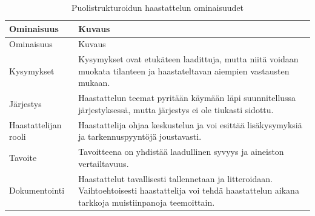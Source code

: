 \documentclass[
  finnish,
  letterpaper,
  DIV=11,
  numbers=noendperiod,
  oneside]{scrreprt}
\begin{document}
\begin{longtable}[]{@{}
  >{\raggedright\arraybackslash}p{}
  >{\raggedright\arraybackslash}p{}@{}}
\caption{Puolistrukturoidun haastattelun
ominaisuudet}\label{tbl-puolistrukturoitu-haastattelu}\tabularnewline
\toprule\noalign{}
\begin{minipage}[b]{\linewidth}\raggedright
Ominaisuus
\end{minipage} & \begin{minipage}[b]{\linewidth}\raggedright
Kuvaus
\end{minipage} \\
\midrule\noalign{}
\endfirsthead
\toprule\noalign{}
\begin{minipage}[b]{\linewidth}\raggedright
Ominaisuus
\end{minipage} & \begin{minipage}[b]{\linewidth}\raggedright
Kuvaus
\end{minipage} \\
\midrule\noalign{}
\endhead
\bottomrule\noalign{}
\endlastfoot
Kysymykset & Kysymykset ovat etukäteen laadittuja, mutta niitä voidaan
muokata tilanteen ja haastateltavan aiempien vastausten mukaan. \\
Järjestys & Haastattelun teemat pyritään käymään läpi suunnitellussa
järjestyksessä, mutta järjestys ei ole tiukasti sidottu. \\
Haastattelijan rooli & Haastattelija ohjaa keskustelua ja voi esittää
lisäkysymyksiä ja tarkennuspyyntöjä joustavasti. \\
Tavoite & Tavoitteena on yhdistää laadullinen syvyys ja aineiston
vertailtavuus. \\
Dokumentointi & Haastattelut tavallisesti tallennetaan ja litteroidaan.
Vaihtoehtoisesti haastattelija voi tehdä haastattelun aikana tarkkoja
muistiinpanoja teemoittain. \\
\end{longtable}
\end{document}
